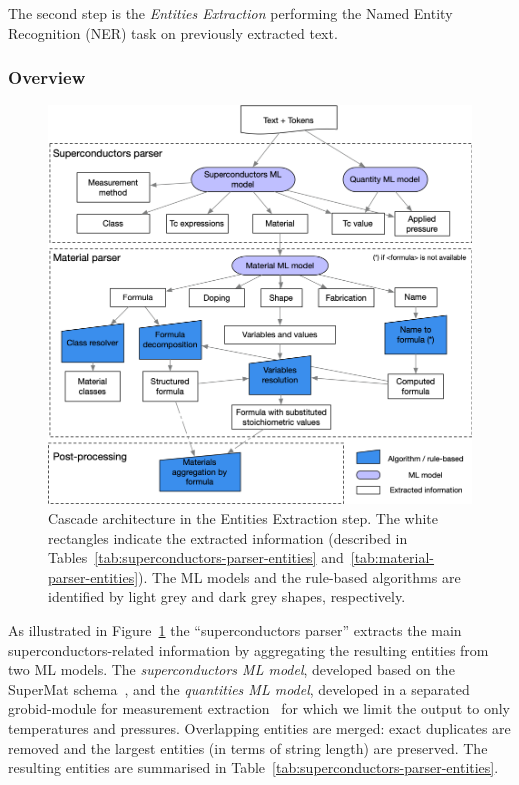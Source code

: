 \documentclass[]{interact}
\theoremstyle{plain}%
\theoremstyle{definition}
\theoremstyle{remark}
\begin{document}
The second step is the \textit{Entities Extraction} performing the Named Entity Recognition (NER) task on previously extracted text.

\subsubsection*{Overview}

\begin{figure}[ht]
    \includegraphics[width=\textwidth]{schema-extraction-colors}
    \caption{\label{fig:extraction-ml-models-cascade-architecture} Cascade architecture in the Entities Extraction step. The white rectangles indicate the extracted information (described in Tables~\ref{tab:superconductors-parser-entities} and~\ref{tab:material-parser-entities}).
        The ML models and the rule-based algorithms are identified by light grey and dark grey shapes, respectively.}
\end{figure}

As illustrated in Figure~\ref{fig:extraction-ml-models-cascade-architecture} the ``superconductors parser'' extracts the main superconductors-related information by aggregating the resulting entities from two ML models.
The \textit{superconductors ML model}, developed based on the SuperMat schema~\cite{foppiano2021supermat}, and the \textit{quantities ML model}, developed in a separated grobid-module for measurement extraction~\cite{foppiano2019quantities} for which we limit the output to only temperatures and pressures.
Overlapping entities are merged: exact duplicates are removed and the largest entities (in terms of string length) are preserved.
The resulting entities are summarised in Table~\ref{tab:superconductors-parser-entities}.
\end{document}

